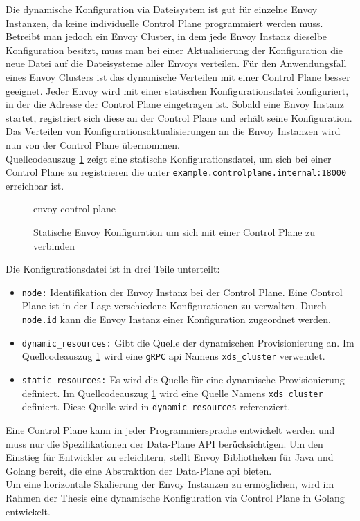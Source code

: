 Die dynamische Konfiguration via Dateisystem ist gut für einzelne Envoy Instanzen, da keine individuelle Control Plane programmiert werden muss. Betreibt man jedoch ein Envoy Cluster, in dem jede Envoy Instanz dieselbe Konfiguration besitzt, muss man bei einer Aktualisierung der Konfiguration die neue Datei auf die Dateisysteme aller Envoys verteilen.
Für den Anwendungsfall eines Envoy Clusters ist das dynamische Verteilen mit einer Control Plane besser geeignet. Jeder Envoy wird mit einer statischen Konfigurationsdatei konfiguriert, in der die Adresse der Control Plane eingetragen ist. Sobald eine Envoy Instanz startet, registriert sich diese an der Control Plane und erhält seine Konfiguration. Das Verteilen von Konfigurationsaktualisierungen an die Envoy Instanzen wird nun von der Control Plane übernommen.
\\
Quellcodeauszug \ref{code:envoy-control-plane} zeigt eine statische Konfigurationsdatei, um sich bei einer Control Plane zu registrieren die unter \verb|example.controlplane.internal:18000| erreichbar ist.
\begin{figure}
    {envoy-control-plane}
    \caption{Statische Envoy Konfiguration um sich mit einer Control Plane zu verbinden}
    \label{code:envoy-control-plane}
\end{figure}
Die Konfigurationsdatei ist in drei Teile unterteilt:
\begin{itemize}
  \item \verb|node:| Identifikation der Envoy Instanz bei der Control Plane. Eine Control Plane ist in der Lage verschiedene Konfigurationen zu verwalten. Durch \verb|node.id| kann die Envoy Instanz einer Konfiguration zugeordnet werden.
  \item \verb|dynamic_resources:| Gibt die Quelle der dynamischen Provisionierung an. Im Quellcodeauszug \ref{code:envoy-control-plane} wird eine \verb|gRPC| \ac{api} Namens \verb|xds_cluster| verwendet.
  \item \verb|static_resources:| Es wird die Quelle für eine dynamische Provisionierung definiert. Im Quellcodeauszug \ref{code:envoy-control-plane} wird eine Quelle Namens \verb|xds_cluster| definiert. Diese Quelle wird in \verb|dynamic_resources| referenziert.
\end{itemize}
Eine Control Plane kann in jeder Programmiersprache entwickelt werden und muss nur die Spezifikationen der Data-Plane API \cite{EnvoyproxyDataplaneapi2021} berücksichtigen. Um den Einstieg für Entwickler zu erleichtern, stellt Envoy Bibliotheken für Java und Golang bereit, die eine Abstraktion der Data-Plane \ac{api} bieten.
\\
Um eine horizontale Skalierung der Envoy Instanzen zu ermöglichen, wird im Rahmen der Thesis eine dynamische Konfiguration via Control Plane in Golang entwickelt.

